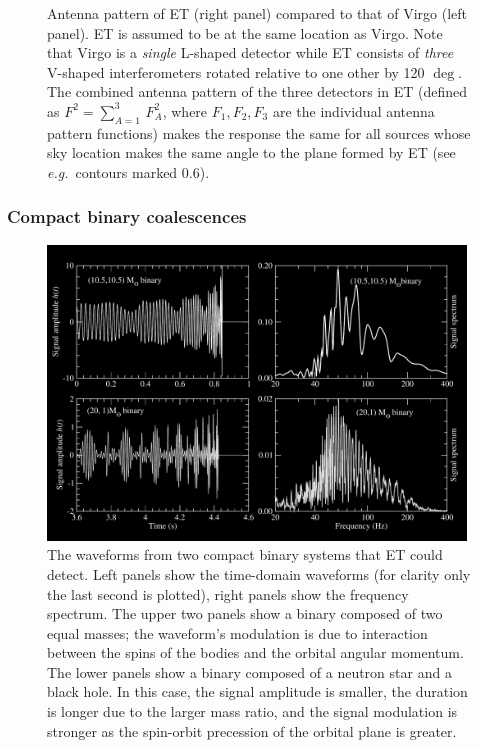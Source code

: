 {\begin{figure}[H]
\vskip 0.3cm
\caption{Antenna pattern of ET (right panel) compared to that of
Virgo (left panel). ET is assumed to be at the same location as
Virgo. Note that Virgo is a {\em single} L-shaped detector while
ET consists of {\em three} V-shaped interferometers rotated relative 
to one other by 120 $\deg.$ The combined antenna pattern of the three detectors 
in ET (defined as $F^2=\sum_{A=1}^3\,F_A^2$, where $F_1,F_2,F_3$ are the
individual antenna pattern functions) makes the response the same for all 
sources whose sky location makes the same angle to the plane formed 
by ET (see \emph{e.g.}\ contours marked 0.6).}
\vskip -0.3cm
\label{fig:response}
\end{figure}
}
\subsubsection{Compact binary coalescences}
\label{sec:binaries}

\begin{figure}
\centering
\includegraphics[width=0.99\textwidth]{./Sec_ET_ScienceCase/spinningBinaries.pdf}
\caption{The waveforms from two compact binary systems that ET could
detect. Left panels show the time-domain waveforms (for clarity only the
last second is plotted), right panels show the frequency spectrum. 
The upper two panels show a binary composed of two equal masses; the 
waveform's modulation is due to interaction between the spins of the bodies 
and the orbital angular momentum. The lower panels show a binary 
composed of a neutron star and a black hole. In this case, the signal 
amplitude is smaller, the duration is longer due to the larger mass ratio, 
and the signal modulation is stronger as the spin-orbit precession of the 
orbital plane is greater.}
\label{fig:chirps}
\end{figure}


